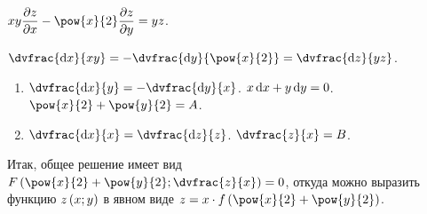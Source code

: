 \documentclass[a5paper,10pt]{article}
\begin{document}
    $xy \parder{z} {x} - \pow{x}{2} \parder{z} {y} = yz$.

    $\dvfrac {\di x} {xy} = -\dvfrac {\di y} {\pow{x}{2}} = \dvfrac {\di z} {yz}$.
    
    \begin{enumerate}
        \item $\dvfrac {\di x} {y} = - \dvfrac {\di y} {x}$.
        $x \di x + y \di y = 0$.
        $\pow{x}{2} + \pow{y}{2} = A$.
        
        \item $\dvfrac {\di x} {x} = \dvfrac {\di z} {z}$.
        $\dvfrac{z}{x} = B$.
    \end{enumerate}
    
    Итак, общее решение имеет вид
    $F\br{\pow{x}{2} + \pow{y}{2}; \dvfrac{z}{x}} = 0$,
    откуда можно выразить функцию $z\left(\hspace{0.01em}x; y\hspace{0.01em}\right)$ в явном виде
    $z = x \cdot f\br{\pow{x}{2} + \pow{y}{2}}$.
\end{document}
